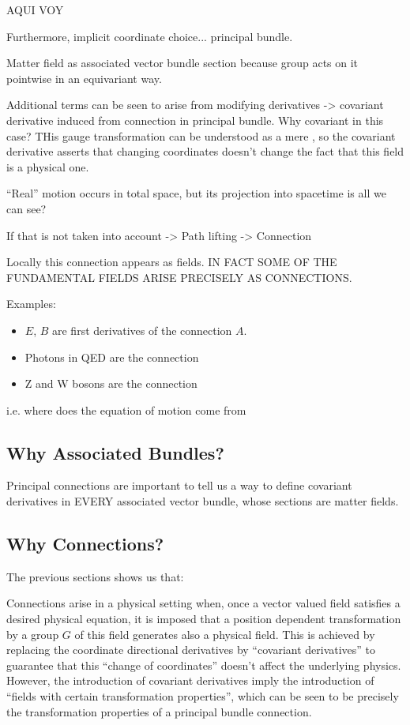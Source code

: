  AQUI VOY
 
 Furthermore, implicit coordinate choice... principal bundle.
 
 Matter field as associated vector bundle section because group acts on it pointwise in an equivariant way.
 
 Additional terms can be seen to arise from modifying derivatives -> covariant derivative induced from connection in principal bundle. Why covariant in this case? THis gauge transformation can be understood as a mere , so the covariant derivative asserts that changing coordinates doesn't change the fact that this field is a physical one.
 

``Real'' motion occurs in total space, but its projection into spacetime is all we can see?

If that is not taken into account -> Path lifting -> Connection

Locally this connection appears as fields. IN FACT SOME OF THE FUNDAMENTAL FIELDS ARISE PRECISELY AS CONNECTIONS.

Examples:
\begin{itemize}
    \item $E$, $B$ are first derivatives of the connection $A$.
    
    \item Photons in QED are the connection
    
    \item Z and W bosons are the connection
\end{itemize}

 i.e. where does the equation of motion come from

\subsection{Why Associated Bundles?}

Principal connections are important to tell us a way to define covariant derivatives in EVERY associated vector bundle, whose sections are matter fields.

\subsection{Why Connections?}

The previous sections shows us that:

Connections arise in a physical setting when, once a vector valued field satisfies a desired physical equation, it is imposed that a position dependent transformation by a group $G$ of this field generates also a physical field. This is achieved by replacing the coordinate directional derivatives by ``covariant derivatives'' to guarantee that this ``change of coordinates'' doesn't affect the underlying physics. However, the introduction of covariant derivatives imply the introduction of ``fields with certain transformation properties'', which can be seen to be precisely the transformation properties of a principal bundle connection.


